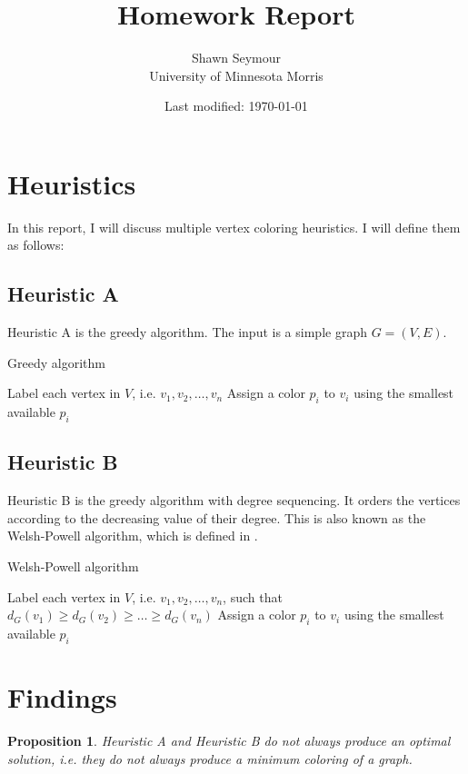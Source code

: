 \documentclass{article}
\title{Homework Report}
\date{Last modified: \today}
\author{Shawn Seymour\\ University of Minnesota Morris}
\newtheorem{prop}{Proposition}
\begin{document}
\maketitle

\section*{Heuristics}
In this report, I will discuss multiple vertex coloring heuristics. I will define them as follows:

\subsection*{Heuristic A}

Heuristic A is the greedy algorithm. The input is a simple graph \(G = (V, E)\).

\begin{algorithm}
\caption{Greedy algorithm}
\begin{algorithmic}[1]
\State Label each vertex in $V$, i.e. $v_1, v_2, \dots, v_n$
\State Assign a color $p_i$ to $v_i$ using the smallest available $p_i$
\EndFor
\end{algorithmic}
\end{algorithm}

\subsection*{Heuristic B}

Heuristic B is the greedy algorithm with degree sequencing. It orders the vertices according to the decreasing value of their degree. This is also known as the Welsh-Powell algorithm, which is defined in \cite{welsh}.

\begin{algorithm}
\caption{Welsh-Powell algorithm}
\begin{algorithmic}[1]
\State Label each vertex in $V$, i.e. $v_1, v_2, \dots, v_n$, such that $d_G(v_1) \geq d_G(v_2) \geq \dots \geq d_G(v_n)$
\State Assign a color $p_i$ to $v_i$ using the smallest available $p_i$
\EndFor
\end{algorithmic}
\end{algorithm}

\section*{Findings}

\begin{prop}
Heuristic A and Heuristic B do not always produce an optimal solution, i.e. they do not always produce a minimum coloring of a graph.
\end{prop}
\end{document}
